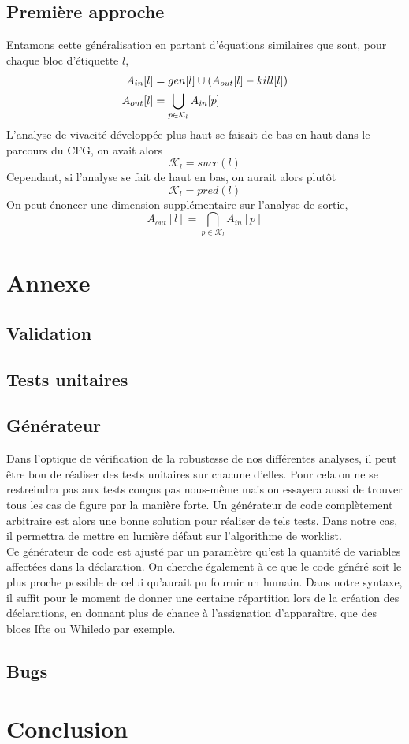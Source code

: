 \documentclass[a4paper, 12pt]{article}
\begin{document}
\subsection{Première approche}
Entamons cette généralisation en partant d'équations similaires que sont, pour chaque bloc d'étiquette $l$,
\begin{align*}
	A_{in}[l] &= gen[l] \cup (A_{out}[l] - kill[l])\\
	A_{out}[l]&= \bigcup\limits_{p \in \mathcal{K}_l} A_{in}[p]
\end{align*}
L'analyse de vivacité développée plus haut se faisait de bas en haut dans le parcours du CFG, on avait alors
\[\mathcal{K}_l = succ(l)\] 
Cependant, si l'analyse se fait de haut en bas, on aurait alors plutôt
\[\mathcal{K}_l = pred(l)\]
On peut énoncer une dimension supplémentaire sur l'analyse de sortie,
\[
	A_{out}[l] = \bigcap\limits_{p \in \mathcal{K}_l} A_{in}[p]	
\]

\section{Annexe}
\subsection{Validation}
\subsection{Tests unitaires}
\subsection{Générateur}
Dans l'optique de vérification de la robustesse de nos différentes analyses, il peut être bon de réaliser
des tests unitaires sur chacune d'elles. Pour cela on ne se restreindra pas aux tests conçus pas nous-même
mais on essayera aussi de trouver tous les cas de figure par la manière forte. Un générateur de code complètement
arbitraire est alors une bonne solution pour réaliser de tels tests. Dans notre cas, il permettra de mettre en
lumière défaut sur l'algorithme de worklist.
\\
Ce générateur de code est ajusté par un paramètre qu'est la quantité de variables affectées dans la déclaration. On
cherche également à ce que le code généré soit le plus proche possible de celui qu'aurait pu fournir un humain.
Dans notre syntaxe, il suffit pour le moment de donner une certaine répartition lors de la création des déclarations,
en donnant plus de chance à l'assignation d'apparaître, que des blocs Ifte ou Whiledo par exemple.
\subsection{Bugs}
\section{Conclusion}
\end{document}
